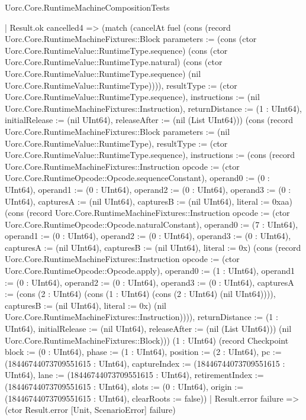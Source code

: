 \begin{lexlean}{Uorc.Core.RuntimeMachineCompositionTests}
\begin{semanticmodule}
{            | Result.ok cancelled4 => (match (cancelAt fuel (cons (record Uorc.Core.RuntimeMachineFixtures::Block {parameters := (cons (ctor Uorc.Core.RuntimeValue::RuntimeType.sequence) (cons (ctor Uorc.Core.RuntimeValue::RuntimeType.natural) (cons (ctor Uorc.Core.RuntimeValue::RuntimeType.sequence) (nil Uorc.Core.RuntimeValue::RuntimeType)))), resultType := (ctor Uorc.Core.RuntimeValue::RuntimeType.sequence), instructions := (nil Uorc.Core.RuntimeMachineFixtures::Instruction), returnDistance := (1 : UInt64), initialRelease := (nil UInt64), releaseAfter := (nil (List UInt64))}) (cons (record Uorc.Core.RuntimeMachineFixtures::Block {parameters := (nil Uorc.Core.RuntimeValue::RuntimeType), resultType := (ctor Uorc.Core.RuntimeValue::RuntimeType.sequence), instructions := (cons (record Uorc.Core.RuntimeMachineFixtures::Instruction {opcode := (ctor Uorc.Core.RuntimeOpcode::Opcode.sequenceConstant), operand0 := (0 : UInt64), operand1 := (0 : UInt64), operand2 := (0 : UInt64), operand3 := (0 : UInt64), capturesA := (nil UInt64), capturesB := (nil UInt64), literal := 0xaa}) (cons (record Uorc.Core.RuntimeMachineFixtures::Instruction {opcode := (ctor Uorc.Core.RuntimeOpcode::Opcode.naturalConstant), operand0 := (7 : UInt64), operand1 := (0 : UInt64), operand2 := (0 : UInt64), operand3 := (0 : UInt64), capturesA := (nil UInt64), capturesB := (nil UInt64), literal := 0x}) (cons (record Uorc.Core.RuntimeMachineFixtures::Instruction {opcode := (ctor Uorc.Core.RuntimeOpcode::Opcode.apply), operand0 := (1 : UInt64), operand1 := (0 : UInt64), operand2 := (0 : UInt64), operand3 := (0 : UInt64), capturesA := (cons (2 : UInt64) (cons (1 : UInt64) (cons (2 : UInt64) (nil UInt64)))), capturesB := (nil UInt64), literal := 0x}) (nil Uorc.Core.RuntimeMachineFixtures::Instruction)))), returnDistance := (1 : UInt64), initialRelease := (nil UInt64), releaseAfter := (nil (List UInt64))}) (nil Uorc.Core.RuntimeMachineFixtures::Block))) (1 : UInt64) (record Checkpoint {block := (0 : UInt64), phase := (1 : UInt64), position := (2 : UInt64), pc := (18446744073709551615 : UInt64), captureIndex := (18446744073709551615 : UInt64), lane := (18446744073709551615 : UInt64), retirementIndex := (18446744073709551615 : UInt64), slots := (0 : UInt64), origin := (18446744073709551615 : UInt64), clearRoots := false}))
              | Result.error failure => (ctor Result.error [Unit, ScenarioError] failure)
}
\end{semanticmodule}
\end{lexlean}
